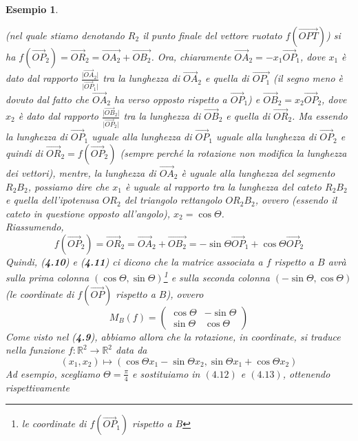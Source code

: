 \documentclass{book}
\newcommand{\abs}[1]{\lvert#1\rvert}
\newtheorem{esempio}{Esempio}
\begin{document}
\begin{esempio}
\begin{enumerate}
    (nel quale stiamo denotando $R_2$ il punto finale del vettore ruotato $f(\vec{OPT})$) si ha
    $f(\vec{OP}_2)=\vec{OR}_2=\vec{OA_2}+\vec{OB_2}$. Ora, chiaramente $\vec{OA}_2=-x_1\vec{OP}_1$, dove $x_1$ è
    dato dal rapporto $\frac{\abs{\vec{OA}_2}}{\abs{\vec{OP}_1}}$ tra la lunghezza di $\vec{OA}_2$ e quella di
    $\vec{OP_1}$ (il segno meno è dovuto dal fatto che $\vec{OA}_2$ ha verso opposto rispetto a $\vec{OP}_1$) e
    $\vec{OB}_2=x_2\vec{OP}_2$, dove $x_2$ è dato dal rapporto $\frac{\abs{\vec{OB}_2}}{\abs{\vec{OP}_2}}$ tra la
    lunghezza di $\vec{OB}_2$ e quella di $\vec{OR}_2$. Ma essendo la lunghezza di $\vec{OP}_1$ uguale alla
    lunghezza di $\vec{OP}_1$ uguale alla lunghezza di $\vec{OP}_2$ e quindi di $\vec{OR}_2=f(\vec{OP}_2)$
    (sempre perché la rotazione non modifica la lunghezza dei vettori), mentre, la lunghezza di $\vec{OA}_2$ è
    uguale alla lunghezza del segmento $R_2B_2$, possiamo dire che $x_1$ è uguale al rapporto tra la lunghezza
    del cateto $R_2B_2$ e quella dell'ipotenusa $OR_2$ del triangolo rettangolo $OR_2B_2$, ovvero (essendo il
    cateto in questione opposto all'angolo), $x_2=\cos\Theta$.\\
    Riassumendo,
    \begin{equation}
      f(\vec{OP}_2)=\vec{OR}_2=\vec{OA}_2+\vec{OB_2}=-\sin\Theta\vec{OP}_1+\cos \Theta\vec{OP}_2
    \end{equation}
    \clearpage
    Quindi, (\textbf{4.10}) e (\textbf{4.11}) ci dicono che la matrice associata a $f$ rispetto a $B$ avrà sulla
    prima colonna $(\cos\Theta,\sin\Theta)$\footnote{le coordinate di $f(\vec{OP}_1)$ rispetto a $B$} e sulla
    seconda colonna $(-\sin\Theta,\cos\Theta)$ (le coordinate di $f(\vec{OP})$ rispetto a $B$), ovvero
    \begin{equation}
      M_B(f)=
      \begin{pmatrix}
        \cos\Theta & -\sin \Theta\\
        \sin\Theta & \cos \Theta
      \end{pmatrix}
    \end{equation}
    Come visto nel (\textbf{4.9}), abbiamo allora che la rotazione, in coordinate, si traduce nella funzione
    $f:\mathds{R}^2\to\mathds{R}^2$ data da
    \begin{equation}
      (x_1,x_2)\mapsto (\cos\Theta x_1-\sin\Theta x_2,\sin\Theta x_1+\cos\Theta x_2)
    \end{equation}
    Ad esempio, scegliamo $\Theta=\frac{\pi}{4}$ e sostituiamo in $(4.12)$ e $(4.13)$, ottenendo rispettivamente

\end{enumerate}
\end{esempio}
\end{document}
